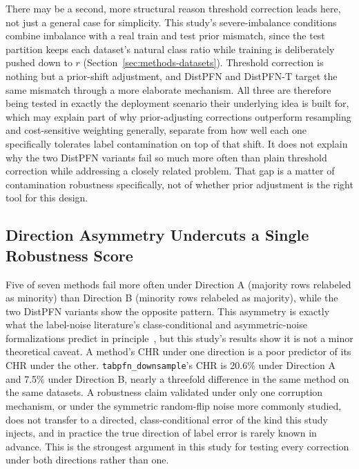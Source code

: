 There may be a second, more structural reason threshold correction leads
here, not just a general case for simplicity. This study's
severe-imbalance conditions combine imbalance with a real train and test
prior mismatch, since the test partition keeps each dataset's natural
class ratio while training is deliberately pushed down to $r$
(Section~\ref{sec:methods-datasets}). Threshold correction is nothing but
a prior-shift adjustment, and DistPFN and DistPFN-T target the same
mismatch through a more elaborate mechanism. All three are therefore
being tested in exactly the deployment scenario their underlying idea is
built for, which may explain part of why prior-adjusting corrections
outperform resampling and cost-sensitive weighting generally, separate
from how well each one specifically tolerates label contamination on top
of that shift. It does not explain why the two DistPFN variants fail so
much more often than plain threshold correction while addressing a
closely related problem. That gap is a matter of contamination
robustness specifically, not of whether prior adjustment is the right
tool for this design.

\subsection{Direction Asymmetry Undercuts a Single Robustness Score}
\label{sec:discussion-direction}

Five of seven methods fail more often under Direction A (majority rows
relabeled as minority) than Direction B (minority rows relabeled as
majority), while the two DistPFN variants show the opposite pattern. This
asymmetry is exactly what the label-noise literature's class-conditional
and asymmetric-noise formalizations
predict in principle~\cite{natarajan2013noisylabels,scott2013asymmetricnoise},
but this study's results show it is not a minor theoretical caveat. A
method's CHR under one direction is a poor predictor of its CHR under the
other. \texttt{tabpfn\_downsample}'s CHR is 20.6\% under Direction A and
7.5\% under Direction B, nearly a threefold difference in the same method
on the same datasets. A robustness claim validated under only one
corruption mechanism, or under the symmetric random-flip noise more
commonly studied, does not transfer to a directed, class-conditional error
of the kind this study injects, and in practice the true direction of
label error is rarely known in advance. This is the strongest argument in
this study for testing every correction under both directions rather than
one.

